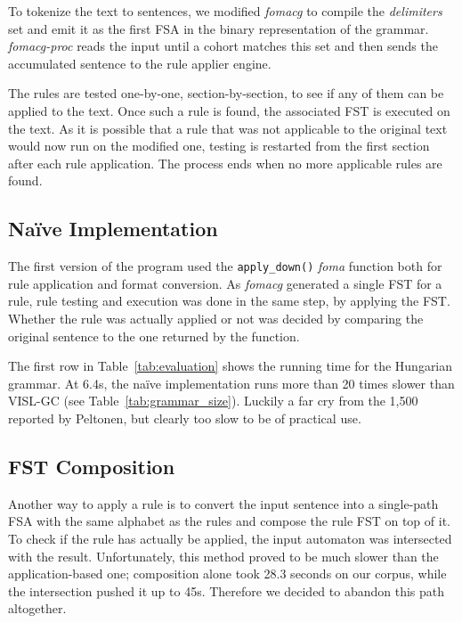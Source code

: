 \documentclass[11pt]{article}
\begin{document}
To tokenize the text to sentences, we modified \emph{fomacg} to compile the
\emph{delimiters} set and emit it as the first FSA in the binary representation
of the grammar. \emph{fomacg-proc} reads the input until a cohort matches this
set and then sends the accumulated sentence to the rule applier engine.

The rules are tested one-by-one, section-by-section, to see if any of them can
be applied to the text. Once such a rule is found, the associated FST is
executed on the text. As it is possible that a rule that was not applicable to
the original text would now run on the modified one, testing is restarted from the
first section after each rule application. The process ends when no more
applicable rules are found.

\subsection{Naïve Implementation}
\label{sec:speed_naive}

The first version of the program used the \texttt{apply\_down()} \emph{foma}
function both for rule application and format conversion. As \emph{fomacg}
generated a single FST for a rule, rule testing and execution was done in the
same step, by applying the FST. Whether the rule was actually applied or not was
decided by comparing the original sentence to the one returned by the function.

The first row in Table~\ref{tab:evaluation} shows the running time for the
Hungarian grammar. At 6.4s, the naïve implementation runs more than 20 times
slower than VISL-GC (see Table~\ref{tab:grammar_size}). Luckily a far cry from
the 1,500 reported by Peltonen, but clearly too slow to be of practical use.

\subsection{FST Composition}
\label{sec:speed_composition}

Another way to apply a rule is to convert the input sentence into a
single-path FSA with the same alphabet as the rules and compose the rule FST
on top of it. To check if the rule has actually be applied, the input
automaton was intersected with the result. Unfortunately, this method proved to
be much slower than the application-based one; composition alone took 28.3
seconds on our corpus, while the intersection pushed it up to 45s. Therefore we
decided to abandon this path altogether.
\end{document}
